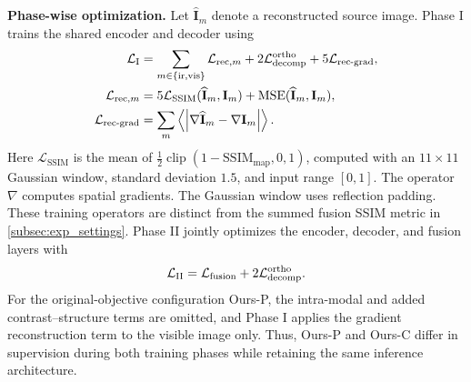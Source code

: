 \textbf{Phase-wise optimization.}
Let $\widehat{\mathbf I}_m$ denote a reconstructed source image. Phase I trains the shared encoder and decoder using
\begin{equation}
\begin{aligned}
 \mathcal L_{\mathrm I}
 &=\sum_{m\in\{\mathrm{ir},\mathrm{vis}\}}\mathcal L_{\mathrm{rec},m}
   +2\mathcal{L}_{\text{decomp}}^{\text{ortho}}+5\mathcal L_{\mathrm{rec\text{-}grad}},\\
 \mathcal L_{\mathrm{rec},m}
 &=5\mathcal L_{\mathrm{SSIM}}(\widehat{\mathbf I}_m,\mathbf I_m)
   +\operatorname{MSE}(\widehat{\mathbf I}_m,\mathbf I_m),\\
 \mathcal L_{\mathrm{rec\text{-}grad}}
 &=\sum_m\left\langle\left|
   \nabla\widehat{\mathbf I}_m-\nabla\mathbf I_m\right|\right\rangle.
\end{aligned}\label{eq:phase1_loss}
\end{equation}
Here $\mathcal L_{\mathrm{SSIM}}$ is the mean of $\tfrac12\operatorname{clip}(1-\mathrm{SSIM}_{\mathrm{map}},0,1)$, computed with an $11\times11$ Gaussian window, standard deviation $1.5$, and input range $[0,1]$. The operator $\nabla$ computes spatial gradients. The Gaussian window uses reflection padding. These training operators are distinct from the summed fusion SSIM metric in \cref{subsec:exp_settings}. Phase II jointly optimizes the encoder, decoder, and fusion layers with
\begin{equation}
 \mathcal L_{\mathrm{II}}=\mathcal{L}_{\text{fusion}}+2\mathcal{L}_{\text{decomp}}^{\text{ortho}}.
 \label{eq:phase2_loss}
\end{equation}
For the original-objective configuration Ours-P, the intra-modal and added contrast--structure terms are omitted, and Phase I applies the gradient reconstruction term to the visible image only. Thus, Ours-P and Ours-C differ in supervision during both training phases while retaining the same inference architecture.
